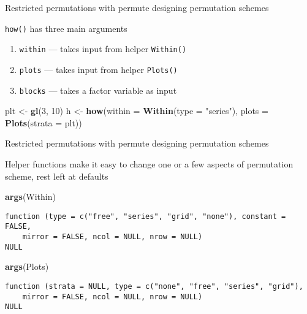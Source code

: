 \documentclass[10pt,ignorenonframetext,compress, aspectratio=169]{beamer}
\newenvironment{Shaded}{\begin{snugshade}}{\end{snugshade}}
\newcommand{\KeywordTok}[1]{\textcolor[rgb]{0.13,0.29,0.53}{\textbf{{#1}}}}
\newcommand{\DataTypeTok}[1]{\textcolor[rgb]{0.13,0.29,0.53}{{#1}}}
\newcommand{\DecValTok}[1]{\textcolor[rgb]{0.00,0.00,0.81}{{#1}}}
\newcommand{\StringTok}[1]{\textcolor[rgb]{0.31,0.60,0.02}{{#1}}}
\newcommand{\NormalTok}[1]{{#1}}
\begin{document}
\begin{frame}[fragile]{Restricted permutations with permute \textbar{}
designing permutation schemes}

\texttt{how()} has three main arguments

\begin{enumerate}
\def\labelenumi{\arabic{enumi}.}
\itemsep1pt\parskip0pt
\item
  \texttt{within} --- takes input from helper \texttt{Within()}
\item
  \texttt{plots} --- takes input from helper \texttt{Plots()}
\item
  \texttt{blocks} --- takes a factor variable as input
\end{enumerate}

\scriptsize

\begin{Shaded}
\begin{Highlighting}[]
\NormalTok{plt <-}\StringTok{ }\KeywordTok{gl}\NormalTok{(}\DecValTok{3}\NormalTok{, }\DecValTok{10}\NormalTok{)}
\NormalTok{h <-}\StringTok{ }\KeywordTok{how}\NormalTok{(}\DataTypeTok{within =} \KeywordTok{Within}\NormalTok{(}\DataTypeTok{type =} \StringTok{"series"}\NormalTok{), }\DataTypeTok{plots =} \KeywordTok{Plots}\NormalTok{(}\DataTypeTok{strata =} \NormalTok{plt))}
\end{Highlighting}
\end{Shaded}

\normalsize

\end{frame}

\begin{frame}[fragile]{Restricted permutations with permute \textbar{}
designing permutation schemes}

Helper functions make it easy to change one or a few aspects of
permutation scheme, rest left at defaults

\scriptsize

\begin{Shaded}
\begin{Highlighting}[]
\KeywordTok{args}\NormalTok{(Within)}
\end{Highlighting}
\end{Shaded}

\begin{verbatim}
function (type = c("free", "series", "grid", "none"), constant = FALSE, 
    mirror = FALSE, ncol = NULL, nrow = NULL) 
NULL
\end{verbatim}

\begin{Shaded}
\begin{Highlighting}[]
\KeywordTok{args}\NormalTok{(Plots)}
\end{Highlighting}
\end{Shaded}

\begin{verbatim}
function (strata = NULL, type = c("none", "free", "series", "grid"), 
    mirror = FALSE, ncol = NULL, nrow = NULL) 
NULL
\end{verbatim}

\normalsize

\end{frame}
\end{document}
